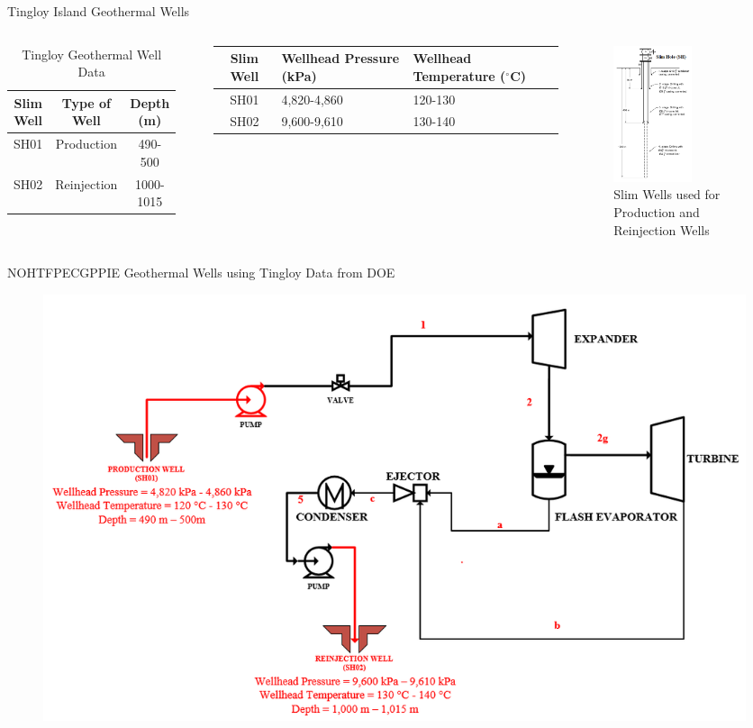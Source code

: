\begin{frame}{Tingloy Island Geothermal Wells}
    \begin{columns}
    \begin{table}[h]
        \centering
        \caption{Tingloy Geothermal Well Data}
        \begin{tabular}{ccc}
        \hline
            Slim Well &  Type of Well & Depth (m) \\
            \hline
             SH01 & Production & 490-500 \\
             SH02 & Reinjection & 1000-1015 \\
             \hline
        \end{tabular}
        \label{tingloywells}
    \end{table}
    \begin{table}[h]
        \centering
        \begin{tabular}{cp{2cm}p{1.75cm}}
        \hline
            Slim Well & Wellhead Pressure (kPa) & Wellhead Temperature ($^\circ$C)\\
            \hline
             SH01 & 4,820-4,860 & 120-130 \\
             SH02 & 9,600-9,610 & 130-140 \\
             \hline
        \end{tabular}
    \end{table}
    \begin{figure}
        \centering
        \includegraphics[height=4cm]{images/slimhole1.png}
        \caption{\centering Slim Wells used for Production and Reinjection Wells \cite{thorhallsson2012slim}}
        \label{fig:slimwells}
    \end{figure}
    \end{columns}
\end{frame}

\begin{frame}{NOHTFPECGPPIE Geothermal Wells using Tingloy Data from DOE\cite{halcon2015detailed}}
    \begin{figure}
        \centering
        \includegraphics[height=0.4\textwidth]{images/nohtfpecgppiewells.png}
    \end{figure}
\end{frame}

